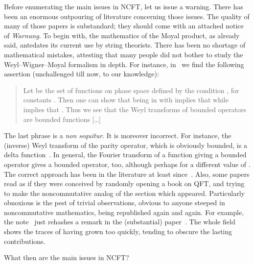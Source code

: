 \documentclass[a4paper,12pt]{article}
\renewcommand{\a}{\alpha}           %
\renewcommand{\b}{\beta}            %
\providecommand{\del}{\partial}         %
\renewcommand{\H}{\mathcal{H}}      %
\providecommand{\K}{\mathcal{K}}        %
\providecommand{\set}[1]{\{\,#1\,\}}     %
\renewcommand{\SS}{\mathcal{S}}     %
\providecommand{\1}{\mathbf{1}}         %
\providecommand{\7}{\dagger}            %
\providecommand{\8}{\bullet}            %
\renewcommand{\.}{\cdot}            %
\renewcommand{\:}{\colon}           %
\begin{document}
Before enumerating the main issues in NCFT, let us issue a warning.
There has been an enormous outpouring of literature concerning those
issues. The quality of many of those papers is substandard; they
should come with an attached notice of \textit{Warnung}. To begin
with, the mathematics of the Moyal product, as already said, antedates
its current use by string theorists. There has been no shortage of
mathematical mistakes, attesting that many people did not bother to
study the Weyl--Wigner--Moyal formalism in depth. For instance,
in~\cite{Harvey} we find the following assertion (unchallenged till
now, to our knowledge):
\begin{quotation}
Let \myHighlight{$\SS^m$}\coordHE{} be the set of functions on phase space defined by
the condition \myHighlight{$\SS^m = \set{f(q,p) : |\del_q^\a \del_p^\b f|
\leq C_{\a\b} (1 + q^2 + p^2)^{(m-\a-\b)/2}}$}\coordHE{}, for constants
\myHighlight{$C_{\a\b}$}\coordHE{}. Then one can show that \coordHE{} being in \myHighlight{$\SS^m$}\coordHE{} with
\coordHE{} implies that \myHighlight{$\hat O_f \in \mathcal{B}(\H)$}\coordHE{} while \coordHE{}
implies that \myHighlight{$\hat O_f \in \K(\H)$}\coordHE{}. Thus we see that the Weyl
transforms of bounded operators are bounded functions [\dots]
\end{quotation}
The last phrase is a {\it non sequitur\/}. It is moreover incorrect.
For instance, the (inverse) Weyl transform of the parity operator,
which is obviously bounded, is a delta function~\cite{Iapetus}. In
general, the Fourier transform of a function giving a bounded operator
gives a bounded operator, too, although perhaps for a different value
of \myHighlight{$\theta$}\coordHE{}. The correct approach has been in the literature at least
since~\cite{Phobos,Deimos}. Also, some papers read as if they were
conceived by randomly opening a book on QFT, and trying to make the
noncommutative analog of the section which appeared. Particularly
obnoxious is the pest of trivial observations, obvious to anyone
steeped in noncommutative mathematics, being republished again and
again. For example, the note~\cite{ChaichianPJTNogo} just rehashes a
remark in the (substantial) paper~\cite{Terashima}. The whole field
shows the traces of having grown too quickly, tending to obscure the
lasting contributions.

\smallskip
What then are the main issues in NCFT?
\end{document}
